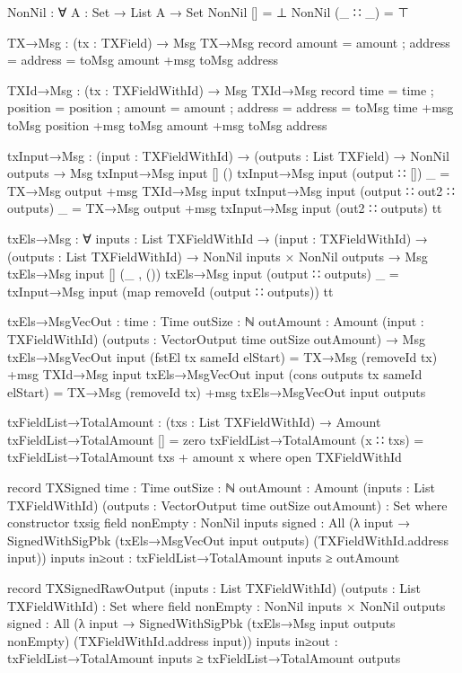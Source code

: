 \documentclass{beamer}
\begin{document}
\begin{code}
    NonNil : ∀ {A : Set} → List A → Set
    NonNil [] = ⊥
    NonNil (_ ∷ _) = ⊤

    TX→Msg : (tx : TXField) → Msg
    TX→Msg record { amount = amount ; address = address } = toMsg amount +msg toMsg address

    TXId→Msg : (tx : TXFieldWithId) → Msg
    TXId→Msg record { time = time ; position = position ; amount = amount ; address = address }
      = toMsg time +msg toMsg position +msg toMsg amount +msg toMsg address

    txInput→Msg : (input : TXFieldWithId) → (outputs : List TXField)
      → NonNil outputs → Msg
    txInput→Msg input [] ()
    txInput→Msg input (output ∷ []) _ = TX→Msg output +msg TXId→Msg input
    txInput→Msg input (output ∷ out2 ∷ outputs) _ = TX→Msg output +msg txInput→Msg input (out2 ∷ outputs) tt

    txEls→Msg : ∀ {inputs : List TXFieldWithId}
      → (input : TXFieldWithId) → (outputs : List TXFieldWithId)
      → NonNil inputs × NonNil outputs → Msg
    txEls→Msg input [] (_ , ())
    txEls→Msg input (output ∷ outputs) _ = txInput→Msg input (map removeId (output ∷ outputs)) tt

    txEls→MsgVecOut :
      {time      : Time}
      {outSize   : ℕ}
      {outAmount : Amount}
      (input     : TXFieldWithId)
      (outputs   : VectorOutput time outSize outAmount)
      → Msg
    txEls→MsgVecOut input (fstEl tx sameId elStart) = TX→Msg (removeId tx) +msg TXId→Msg input
    txEls→MsgVecOut input (cons outputs tx sameId elStart) =
      TX→Msg (removeId tx) +msg txEls→MsgVecOut input outputs

    txFieldList→TotalAmount : (txs : List TXFieldWithId) → Amount
    txFieldList→TotalAmount [] = zero
    txFieldList→TotalAmount (x ∷ txs) = txFieldList→TotalAmount txs + amount x
      where open TXFieldWithId

    record TXSigned
      {time      : Time}
      {outSize   : ℕ}
      {outAmount : Amount}
      (inputs    : List TXFieldWithId)
      (outputs   : VectorOutput time outSize outAmount) : Set where
      constructor txsig
      field
        nonEmpty : NonNil inputs
        signed   : All
          (λ input →
          SignedWithSigPbk (txEls→MsgVecOut input outputs)
                          (TXFieldWithId.address input))
                          inputs
        in≥out : txFieldList→TotalAmount inputs ≥ outAmount

    record TXSignedRawOutput
      (inputs : List TXFieldWithId)
      (outputs : List TXFieldWithId) : Set where
      field
        nonEmpty : NonNil inputs × NonNil outputs
        signed   : All
          (λ input →
          SignedWithSigPbk (txEls→Msg input outputs nonEmpty)
                          (TXFieldWithId.address input))
                          inputs
        in≥out : txFieldList→TotalAmount inputs ≥ txFieldList→TotalAmount outputs


\end{code}
\end{document}
